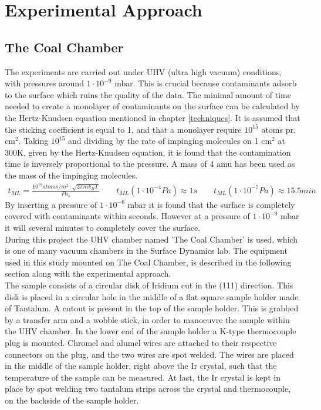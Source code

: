 \chapter{Experimental Approach}
\label{cha:procedure}

\section{The Coal Chamber}

  The experiments are carried out under UHV (ultra high vacuum) conditions, with pressures around $1\cdot 10^{-9}$ mbar. This is crucial because contaminants adsorb to the surface which ruins the quality of the data. The minimal amount of time needed to create a monolayer of contaminants on the surface can be calculated by the Hertz-Knudsen equation mentioned in chapter \ref{techniques}. It is assumed that the sticking coefficient is equal to 1, and that a monolayer require $10^{15}$ atoms pr. cm$^2$.\cite{MLkilde} Taking $10^{15}$ and dividing by the rate of impinging molecules on 1 cm$^2$ at 300K, given by the Hertz-Knudsen equation, it is found that the contamination time is inversely proportional to the pressure. A mass of 4 amu has been used as the mass of the impinging molecules.\\
  \begin{align}
    t_{ML} = \frac{10^{19}atoms/m^2 \cdot \sqrt{2\pi m k_B T}}{P a_s} \qquad t_{ML}(1\cdot10^{-4}Pa) \approx 1s \qquad t_{ML}(1\cdot10^{-7}Pa) \approx 15.5min
  \end{align}
  By inserting a pressure of $1\cdot 10^{-6}$ mbar it is found that the surface is completely covered with contaminants within seconds. However at a pressure of $1\cdot 10^{-9}$ mbar it will several minutes to completely cover the surface.\\
  During this project the UHV chamber named 'The Coal Chamber' is used, which is one of many vacuum chambers in the Surface Dynamics lab. The equipment used in this study mounted on The Coal Chamber, is described in the following section along with the experimental approach. \\
  The sample consists of a circular disk of Iridium cut in the (111) direction. This disk is placed in a circular hole in the middle of a flat square sample holder made of Tantalum.  A cutout is present in the top of the sample holder. This is grabbed by a transfer arm and a wobble stick, in order to manoeuvre the sample within the UHV chamber. In the lower end of the sample holder a K-type thermocouple plug is mounted. Chromel and alumel wires are attached to their respective connectors on the plug, and the two wires are spot welded. The wires are placed in the middle of the sample holder, right above the Ir crystal, such that the temperature of the sample can be measured. At last, the Ir crystal is kept in place by spot welding two tantalum strips across the crystal and thermocouple, on the backside of the sample holder.\\
